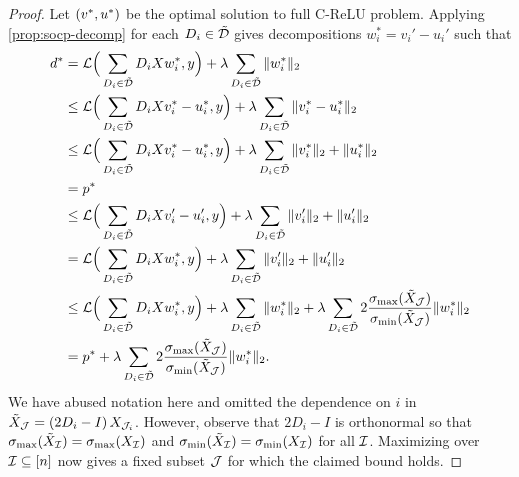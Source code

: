 \begin{proof}
    Let \( \left(v^*, u^*\right) \) be the optimal solution to full C-ReLU problem.
    Applying \cref{prop:socp-decomp} for each \( D_i \in \tilde {\mathcal{D}} \) gives decompositions \( w_i^* = v_i' - u_i' \) such that
    \begin{align*}
        d^*
         & = \mathcal{L}\Big(  \sum_{D_i \in \tilde {\mathcal{D}}} D_i X w_i^*, y\Big) + \lambda \sum_{D_i \in \tilde {\mathcal{D}}} \|w_i^*\|_2                                                                                                                                               \\
         & \leq \mathcal{L}\Big(  \sum_{D_i \in \tilde {\mathcal{D}}} D_i X v^*_i - u_i^*, y\Big) + \lambda \sum_{D_i \in \tilde {\mathcal{D}}} \|v_i^* - u_i^*\|_2                                                                                                                            \\
         & \leq \mathcal{L}\Big(  \sum_{D_i \in \tilde {\mathcal{D}}} D_i X v^*_i - u_i^*, y\Big) + \lambda \sum_{D_i \in \tilde {\mathcal{D}}} \|v_i^*\|_2 + \|u_i^*\|_2                                                                                                                   \\
         & = p^*                                                                                                                                                                                                                                                                  \\
         & \leq \mathcal{L}\Big(  \sum_{D_i \in \tilde {\mathcal{D}}} D_i X v'_i - u_i', y\Big) + \lambda \sum_{D_i \in \tilde {\mathcal{D}}} \|v_i'\|_2 + \|u_i'\|_2                                                                                                                       \\
         & = \mathcal{L}\Big(  \sum_{D_i \in \tilde {\mathcal{D}}} D_i X w^*_i, y\Big) + \lambda \sum_{D_i \in \tilde {\mathcal{D}}} \|v_i'\|_2 + \|u_i'\|_2                                                                                                                                \\
         & \leq \mathcal{L}\Big(  \sum_{D_i \in \tilde {\mathcal{D}}} D_i X w^*_i, y\Big) + \lambda \sum_{D_i \in \tilde {\mathcal{D}}} \|w_i^*\|_2 + \lambda \sum_{D_i \in \tilde {\mathcal{D}}} 2 \frac{\sigma_{\text{max}}(\tilde X_{\mathcal{J}})}{\sigma_{\text{min}}(\tilde X_{\mathcal{J}})} \|w_i^*\|_2 \\
         & = p^* + \lambda \sum_{D_i \in \tilde {\mathcal{D}}} 2 \frac{\sigma_{\text{max}}(\tilde X_{\mathcal{J}})}{\sigma_{\text{min}}(\tilde X_{\mathcal{J}})} \|w_i^*\|_2.
    \end{align*}
    We have abused notation here and omitted the dependence on \( i \) in \( \tilde X_{\mathcal{J}} = \left(2 D_i -I\right) X_{\mathcal{J}_i} \).
    However, observe that \( 2D_i - I \) is orthonormal so that \( \sigma_{\text{max}}(\tilde X_{\mathcal{I}}) = \sigma_{\text{max}}(X_{\mathcal{I}}) \) and \( \sigma_{\text{min}}(\tilde X_{\mathcal{I}}) = \sigma_{\text{min}}(X_{\mathcal{I}}) \) for all \( \mathcal{I} \).
    Maximizing over \( \mathcal{I} \subseteq [n] \) now gives a fixed subset \( \mathcal{J} \) for which the claimed bound holds.
\end{proof}

